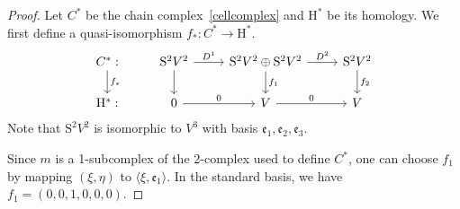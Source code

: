 \documentclass{amsart}
\renewcommand{\S}{\mathrm{S}}
\theoremstyle{definition}
\begin{document}
\begin{proof}
    Let $C^\ast$ be the chain complex~\eqref{cellcomplex} and $\mathrm{H}^\ast$ be its homology. We first define a quasi-isomorphism $f_\ast:C^*\to \mathrm{H}^\ast$.
    \begin{equation*}
        \begin{tikzcd}
        C^\ast : \ar["f_\ast",d] & \S^2V^2 \ar[r,"D^1"] \ar[d]  & \S^2V^2\oplus \S^2V^2 \ar[r,"D^2"]\ar[d,"f_1"]    & \S^2V^2 \ar[d,"f_2"]\\ 
        \mathrm{H}^\ast : & 0 \ar[r, "0"]   & V \ar[r,"0"]          & V
        \end{tikzcd}    
    \end{equation*}
    Note that $\S^2 V^2$ is isomorphic to $V^3$ with basis $\mathfrak{e}_1,\mathfrak{e}_2,\mathfrak{e}_3$.
    
    Since $m$ is a 1-subcomplex of the 2-complex used to define $C^\ast$, one can choose $f_1$ by mapping $(\xi,\eta)$ to $\langle \xi, \mathfrak{e}_1 \rangle$. In the standard basis, we have $f_1=(0,0,1,0,0,0)$. 


\end{proof}
\end{document}
